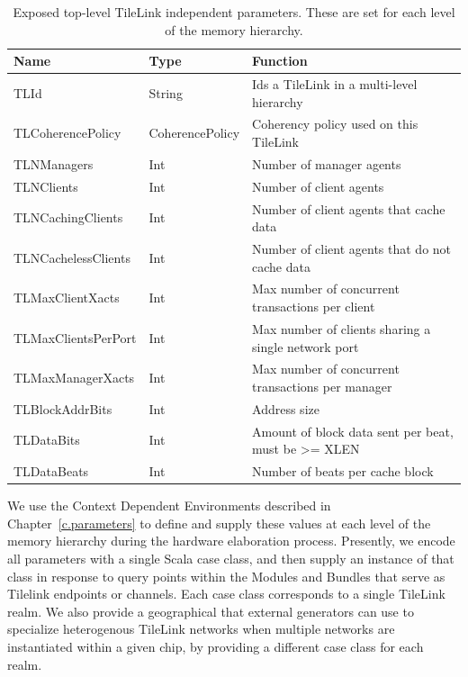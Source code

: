 \begin{table}[t]
\begin{center}
\begin{tabular}{|l|l|l|}
    \hline
Name & Type & Function \\ \hline \hline
TLId & String & Ids a TileLink in a multi-level hierarchy \\ \hline
TLCoherencePolicy & CoherencePolicy & Coherency policy used on this TileLink \\ \hline
TLNManagers & Int & Number of manager agents \\ \hline
TLNClients & Int & Number of client agents \\ \hline
TLNCachingClients & Int & Number of client agents that cache data \\ \hline
TLNCachelessClients & Int & Number of client agents that do not cache data \\ \hline
TLMaxClientXacts & Int & Max number of concurrent transactions per client \\ \hline
TLMaxClientsPerPort & Int & Max number of clients sharing a single network port \\ \hline
TLMaxManagerXacts & Int & Max number of concurrent transactions per manager \\ \hline
TLBlockAddrBits & Int & Address size \\ \hline
TLDataBits & Int & Amount of block data sent per beat, must be >= XLEN \\ \hline
TLDataBeats & Int & Number of beats per cache block \\ \hline
\end{tabular}
\end{center}
\caption{Exposed top-level TileLink independent parameters. These are set for each level of the memory hierarchy.}
\label{tab:tlparams}
\end{table}

We use the Context Dependent Environments described in Chapter~\ref{c.parameters} to define and supply these values
at each level of the memory hierarchy during the hardware elaboration process.
Presently, we encode all parameters with a single Scala case class, and then supply an instance of that class in
response to query points within the Modules and Bundles that serve as Tilelink endpoints or channels.
Each case class corresponds to a single TileLink realm.
We also provide a geographical  that external generators can use to specialize heterogenous TileLink
networks when multiple networks are instantiated within a given chip, by providing a different case class for each realm.

